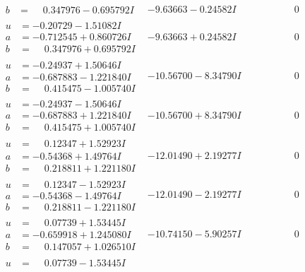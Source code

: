 \documentclass[1p]{elsarticle_modified}
\theoremstyle{definition}
\begin{document}
$$\begin{array}{c|c|c}
\begin{aligned}
b &= \phantom{-}0.347976 - 0.695792 I\end{aligned}
 & -9.63663 - 0.24582 I & \phantom{-0.000000 } 0 \\ \hline\begin{aligned}
u &= -0.20729 - 1.51082 I \\
a &= -0.712545 + 0.860726 I \\
b &= \phantom{-}0.347976 + 0.695792 I\end{aligned}
 & -9.63663 + 0.24582 I & \phantom{-0.000000 } 0 \\ \hline\begin{aligned}
u &= -0.24937 + 1.50646 I \\
a &= -0.687883 - 1.221840 I \\
b &= \phantom{-}0.415475 - 1.005740 I\end{aligned}
 & -10.56700 - 8.34790 I & \phantom{-0.000000 } 0 \\ \hline\begin{aligned}
u &= -0.24937 - 1.50646 I \\
a &= -0.687883 + 1.221840 I \\
b &= \phantom{-}0.415475 + 1.005740 I\end{aligned}
 & -10.56700 + 8.34790 I & \phantom{-0.000000 } 0 \\ \hline\begin{aligned}
u &= \phantom{-}0.12347 + 1.52923 I \\
a &= -0.54368 + 1.49764 I \\
b &= \phantom{-}0.218811 + 1.221180 I\end{aligned}
 & -12.01490 + 2.19277 I & \phantom{-0.000000 } 0 \\ \hline\begin{aligned}
u &= \phantom{-}0.12347 - 1.52923 I \\
a &= -0.54368 - 1.49764 I \\
b &= \phantom{-}0.218811 - 1.221180 I\end{aligned}
 & -12.01490 - 2.19277 I & \phantom{-0.000000 } 0 \\ \hline\begin{aligned}
u &= \phantom{-}0.07739 + 1.53445 I \\
a &= -0.659918 + 1.245080 I \\
b &= \phantom{-}0.147057 + 1.026510 I\end{aligned}
 & -10.74150 - 5.90257 I & \phantom{-0.000000 } 0 \\ \hline\begin{aligned}
u &= \phantom{-}0.07739 - 1.53445 I \\

\end{aligned}
\end{array}$$
\end{document}
